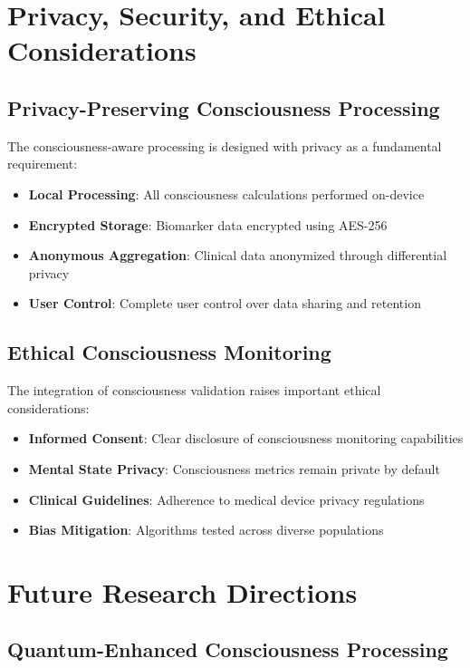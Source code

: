 \documentclass[12pt,a4paper]{article}
\begin{document}
\section{Privacy, Security, and Ethical Considerations}

\subsection{Privacy-Preserving Consciousness Processing}

The consciousness-aware processing is designed with privacy as a fundamental requirement:

\begin{itemize}
\item \textbf{Local Processing}: All consciousness calculations performed on-device
\item \textbf{Encrypted Storage}: Biomarker data encrypted using AES-256
\item \textbf{Anonymous Aggregation}: Clinical data anonymized through differential privacy
\item \textbf{User Control}: Complete user control over data sharing and retention
\end{itemize}

\subsection{Ethical Consciousness Monitoring}

The integration of consciousness validation raises important ethical considerations:

\begin{itemize}
\item \textbf{Informed Consent}: Clear disclosure of consciousness monitoring capabilities
\item \textbf{Mental State Privacy}: Consciousness metrics remain private by default
\item \textbf{Clinical Guidelines}: Adherence to medical device privacy regulations
\item \textbf{Bias Mitigation}: Algorithms tested across diverse populations
\end{itemize}

\section{Future Research Directions}

\subsection{Quantum-Enhanced Consciousness Processing}
\end{document}
